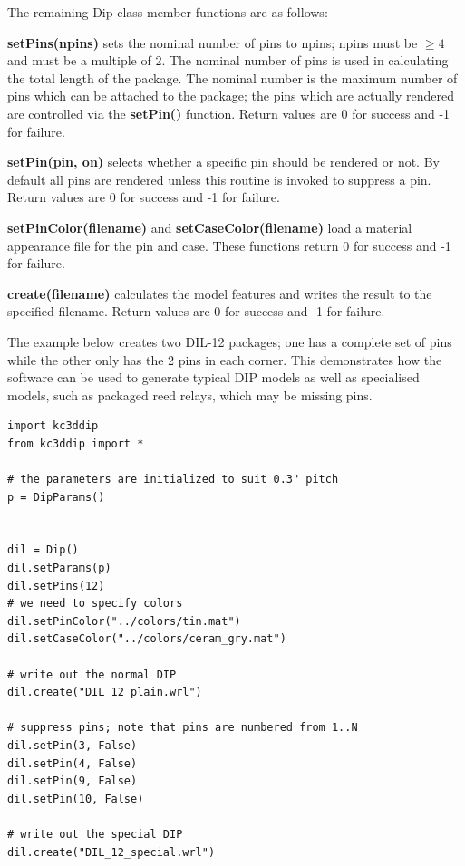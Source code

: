 The remaining Dip class member functions are as follows:

\textbf{setPins(npins)} sets the nominal number of pins to npins; npins must
be $\ge4$ and must be a multiple of 2. The nominal number of pins is used in
calculating the total length of the package. The nominal number is the maximum
number of pins which can be attached to the package; the pins which are
actually rendered are controlled via the \textbf{setPin()} function.
Return values are 0 for success and -1 for failure.

\textbf{setPin(pin, on)} selects whether a specific pin should be rendered or
not. By default all pins are rendered unless this routine is invoked to suppress
a pin. Return values are 0 for success and -1 for failure.

\textbf{setPinColor(filename)} and \textbf{setCaseColor(filename)} load
a material appearance file for the pin and case. These functions return 0
for success and -1 for failure.

\textbf{create(filename)} calculates the model features and writes the
result to the specified filename. Return values are 0 for success and -1 for failure.

The example below creates two DIL-12 packages; one has a complete set of pins while
the other only has the 2 pins in each corner. This demonstrates how the software
can be used to generate typical DIP models as well as specialised models, such as
packaged reed relays, which may be missing pins.

\begin{verbatim}
import kc3ddip
from kc3ddip import *

# the parameters are initialized to suit 0.3" pitch
p = DipParams()


dil = Dip()
dil.setParams(p)
dil.setPins(12)
# we need to specify colors
dil.setPinColor("../colors/tin.mat")
dil.setCaseColor("../colors/ceram_gry.mat")

# write out the normal DIP
dil.create("DIL_12_plain.wrl")

# suppress pins; note that pins are numbered from 1..N
dil.setPin(3, False)
dil.setPin(4, False)
dil.setPin(9, False)
dil.setPin(10, False)

# write out the special DIP
dil.create("DIL_12_special.wrl")
\end{verbatim}

